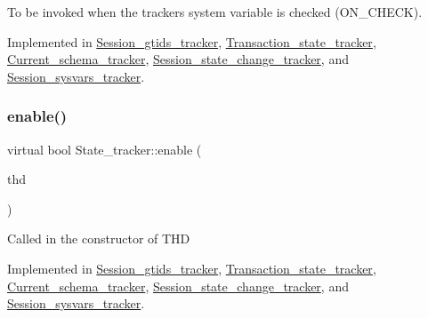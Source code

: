 To be invoked when the tracker\textquotesingle{}s system variable is checked (O\+N\+\_\+\+C\+H\+E\+CK). 

Implemented in \mbox{\hyperlink{classSession__gtids__tracker_a92148b2f6afc9101d8a56b35525491ed}{Session\+\_\+gtids\+\_\+tracker}}, \mbox{\hyperlink{classTransaction__state__tracker_ab1c253155bc5bbab9edf22dc64fffa20}{Transaction\+\_\+state\+\_\+tracker}}, \mbox{\hyperlink{classCurrent__schema__tracker_adb85ededcff63655f491046f93a82cba}{Current\+\_\+schema\+\_\+tracker}}, \mbox{\hyperlink{classSession__state__change__tracker_ada427c6ab34f2fac5ba8eeee84ac1ec2}{Session\+\_\+state\+\_\+change\+\_\+tracker}}, and \mbox{\hyperlink{classSession__sysvars__tracker_a8e2849a2c33fbbfcd81243d8d44fea6f}{Session\+\_\+sysvars\+\_\+tracker}}.

\mbox{\label{classState__tracker_a65cd4b0d77f079f4c41620c0bf314939}} 
\subsubsection{\texorpdfstring{enable()}{enable()}}
{\footnotesize\ttfamily virtual bool State\+\_\+tracker\+::enable (\begin{DoxyParamCaption}\item[{T\+HD $\ast$}]{thd }\end{DoxyParamCaption})\hspace{0.3cm}{\ttfamily [pure virtual]}}

Called in the constructor of T\+HD 

Implemented in \mbox{\hyperlink{classSession__gtids__tracker_a170e0e7c09b4a143c7f3f6e710b435ce}{Session\+\_\+gtids\+\_\+tracker}}, \mbox{\hyperlink{classTransaction__state__tracker_a1027295403af650734a45d8281cc5d1c}{Transaction\+\_\+state\+\_\+tracker}}, \mbox{\hyperlink{classCurrent__schema__tracker_a7d1b177b9d6cd378e072aea79c07252c}{Current\+\_\+schema\+\_\+tracker}}, \mbox{\hyperlink{classSession__state__change__tracker_a3ec79835d60171eb55647f978ee34220}{Session\+\_\+state\+\_\+change\+\_\+tracker}}, and \mbox{\hyperlink{classSession__sysvars__tracker_abe0b7f50ef4c4e269a077f7784d2ce28}{Session\+\_\+sysvars\+\_\+tracker}}.

\mbox{\label{classState__tracker_a99311fbb724be3f1bcf5bb34a4f1a873}} 
